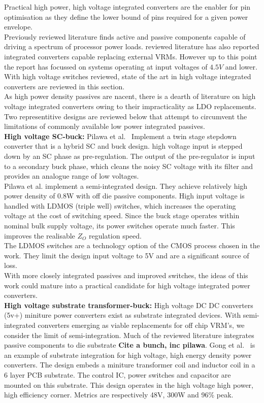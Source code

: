 \documentclass[letterpaper,twocolumn,10pt]{article}
\begin{document}
Practical high power, high voltage integrated converters are the enabler for pin optimisation as they define the lower bound of pins required for a given power envelope.\\
Previously reviewed literature finds active and passive components capable of driving a spectrum of processor power loads. reviewed literature has also reported integrated converters capable replacing external VRMs. However up to this point the report has focussed on systems operating at input voltages of $4.5V$ and lower. With high voltage switches reviewed, state of the art in high voltage integrated converters are reviewed in this section.\\
\indent As high power density passives are nacent, there is a dearth of literature on high voltage integrated converters owing to their impracticality as LDO replacements. Two representitive designs are reviewed below that attempt to circumvent the limitations of commonly available low power integrated passives.\\
\textbf{High voltage SC-buck: }Pilawa et al.~\cite{pilawa2012} Implement a twin stage stepdown converter that is a hybrid SC and buck design. high voltage input is stepped down by an SC phase as pre-regulation. The output of the pre-regulator is input to a secondary buck phase, which cleans the noisy SC voltage with its filter and provides an analogue range of low voltages.\\
Pilawa et al. implement a semi-integrated design. They achieve relatively high power density of 0.8W with off die passive components. High input voltage is handled with LDMOS (triple well) switches, which increases the operating voltage at the cost of switching speed. Since the buck stage operates within nominal bulk supply voltage, its power switches operate much faster. This improves the realisable $Z_O$ regulation speed.\\
The LDMOS switches are a technology option of the CMOS process chosen in the work. They limit the design input voltage to 5V and are a significant source of loss.\\
With more closely integrated passives and improved switches, the ideas of this work could mature into a practical candidate for high voltage integrated power converters.\\
\textbf{High voltage substrate transformer-buck: }High voltage DC DC converters (5v+) miniture power converters exist as substrate integrated devices. With semi-integrated converters emerging as viable replacements for off chip VRM's, we consider the limit of semi-integration. Much of the reviewed literature integrates passive components to die substrate \textbf{Cite a bunch, inc pilawa}. Gong et al.~\cite{Gong2008} is an example of substrate integration for high voltage, high energy density power converters. The design embeds a miniture transformer coil and inductor coil in a 6 layer PCB substrate. The control IC, power switches and capacitor are mounted on this substrate. This design operates in the high voltage high power, high efficiency corner. Metrics are respectively 48V, 300W and 96\% peak.\\
\end{document}
